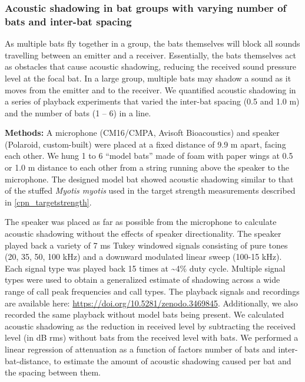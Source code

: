 \documentclass[
]{book}
\begin{document}
\hypertarget{acoustic-shadowing-in-bat-groups-with-varying-number-of-bats-and-inter-bat-spacing}{%
\subsubsection{\texorpdfstring{Acoustic shadowing in bat groups with varying number of bats and inter-bat spacing \label{cpn_shadowing}}{Acoustic shadowing in bat groups with varying number of bats and inter-bat spacing }}\label{acoustic-shadowing-in-bat-groups-with-varying-number-of-bats-and-inter-bat-spacing}}

As multiple bats fly together in a group, the bats themselves will block all sounds travelling between an emitter and a receiver. Essentially, the bats themselves act as obstacles that cause acoustic shadowing, reducing the received sound pressure level at the focal bat. In a large group, multiple bats may shadow a sound as it moves from the emitter and to the receiver. We quantified acoustic shadowing in a series of playback experiments that varied the inter-bat spacing (0.5 and 1.0 m) and the number of bats (1 -- 6) in a line.

\textbf{Methods:} A microphone (CM16/CMPA, Avisoft Bioacoustics) and speaker
(Polaroid, custom-built) were placed at a fixed distance of 9.9 m apart, facing each other. We hung 1 to 6 ``model bats'' made of foam with paper wings at 0.5 or 1.0 m distance to each other from a string running above the speaker to the microphone. The designed model bat showed acoustic shadowing similar to that of the stuffed \emph{Myotis myotis} used in the target strength measurements described in \ref{cpn_targetstrength}.

The speaker was placed as far as possible from the microphone to calculate
acoustic shadowing without the effects of speaker directionality. The speaker
played back a variety of 7 ms Tukey windowed signals consisting of pure tones
(20, 35, 50, 100 kHz) and a downward modulated linear sweep (100-15 kHz). Each
signal type was played back 15 times at \textasciitilde4\% duty cycle. Multiple signal types were used to obtain a generalized estimate of shadowing across a wide range of call peak frequencies and call types. The playback signals and recordings are available here: \url{https://doi.org/10.5281/zenodo.3469845}. Additionally, we also recorded the same playback without model bats being present. We calculated acoustic shadowing as the reduction in received level by subtracting the received level (in dB rms) without bats from the received level with bats. We performed a linear regression of attenuation as a function of factors number of bats and inter-bat-distance, to estimate the amount of acoustic shadowing caused per bat and the spacing between them.
\end{document}
